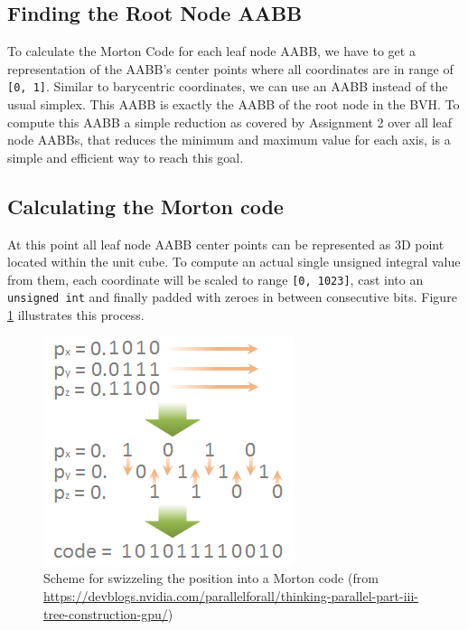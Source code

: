 \documentclass[letterpaper, 10 pt, conference]{IEEEconf}  %
\begin{document}
\subsection{Finding the Root Node AABB}

To calculate the Morton Code for each leaf node AABB, we have to get a representation of the AABB's center points where all coordinates are in range of \mbox{\texttt{[0, 1]}}. Similar to barycentric coordinates, we can use an AABB instead of the usual simplex. This AABB is exactly the AABB of the root node in the BVH. To compute this AABB a simple reduction as covered by Assignment 2 over all leaf node AABBs, that reduces the minimum and maximum value for each axis, is a simple and efficient way to reach this goal.

\subsection{Calculating the Morton code}

At this point all leaf node AABB center points can be represented as 3D point located within the unit cube. To compute an actual single unsigned integral value from them, each coordinate will be scaled to range \mbox{\texttt{[0, 1023]}}, cast into an \texttt{unsigned int} and finally padded with zeroes in between consecutive bits. Figure \ref{fig:swizzle} illustrates this process.
\begin{figure}[!th]
   \centering
   \label{fig:swizzle}
   \includegraphics[width=0.8\linewidth]{figures/bitswizzle.png}
   \caption{Scheme for swizzeling the position into a Morton code (from \url{https://devblogs.nvidia.com/parallelforall/thinking-parallel-part-iii-tree-construction-gpu/})}
\end{figure}
\end{document}
